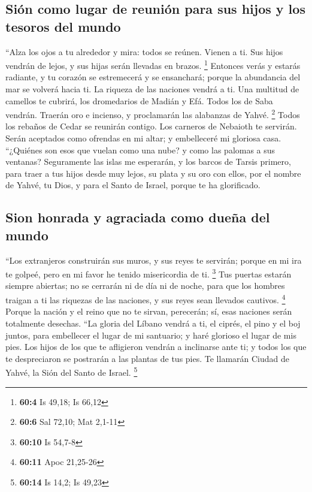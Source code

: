 \begin{paracol}{2}
\hypertarget{siuxf3n-como-lugar-de-reuniuxf3n-para-sus-hijos-y-los-tesoros-del-mundo}{%
\subsection{Sión como lugar de reunión para sus hijos y los tesoros del
mundo}\label{siuxf3n-como-lugar-de-reuniuxf3n-para-sus-hijos-y-los-tesoros-del-mundo}}

 ``Alza los ojos a tu alrededor y mira: todos se reúnen.
Vienen a ti. Sus hijos vendrán de lejos, y sus hijas serán llevadas en
brazos. \footnote{\textbf{60:4} Is 49,18; Is 66,12} 
Entonces verás y estarás radiante, y tu corazón se estremecerá y se
ensanchará; porque la abundancia del mar se volverá hacia ti. La riqueza
de las naciones vendrá a ti.  Una multitud de camellos te
cubrirá, los dromedarios de Madián y Efá. Todos los de Saba vendrán.
Traerán oro e incienso, y proclamarán las alabanzas de Yahvé.
\footnote{\textbf{60:6} Sal 72,10; Mat 2,1-11}  Todos los
rebaños de Cedar se reunirán contigo. Los carneros de Nebaioth te
servirán. Serán aceptados como ofrendas en mi altar; y embelleceré mi
gloriosa casa.  ``¿Quiénes son esos que vuelan como una
nube? y como las palomas a sus ventanas?  Seguramente las
islas me esperarán, y los barcos de Tarsis primero, para traer a tus
hijos desde muy lejos, su plata y su oro con ellos, por el nombre de
Yahvé, tu Dios, y para el Santo de Israel, porque te ha glorificado.

\hypertarget{sion-honrada-y-agraciada-como-dueuxf1a-del-mundo}{%
\subsection{Sion honrada y agraciada como dueña del
mundo}\label{sion-honrada-y-agraciada-como-dueuxf1a-del-mundo}}

 ``Los extranjeros construirán sus muros, y sus reyes te
servirán; porque en mi ira te golpeé, pero en mi favor he tenido
misericordia de ti. \footnote{\textbf{60:10} Is 54,7-8} 
Tus puertas estarán siempre abiertas; no se cerrarán ni de día ni de
noche, para que los hombres traigan a ti las riquezas de las naciones, y
sus reyes sean llevados cautivos. \footnote{\textbf{60:11} Apoc 21,25-26}
 Porque la nación y el reino que no te sirvan, perecerán;
sí, esas naciones serán totalmente desechas.  ``La gloria
del Líbano vendrá a ti, el ciprés, el pino y el boj juntos, para
embellecer el lugar de mi santuario; y haré glorioso el lugar de mis
pies.  Los hijos de los que te afligieron vendrán a
inclinarse ante ti; y todos los que te despreciaron se postrarán a las
plantas de tus pies. Te llamarán Ciudad de Yahvé, la Sión del Santo de
Israel. \footnote{\textbf{60:14} Is 14,2; Is 49,23}


\end{paracol}
